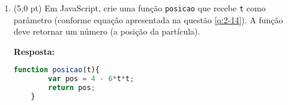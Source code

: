 \documentclass[12pt,a4paper,oneside]{article}
\begin{document}
\begin{enumerate}
\begin{enumerate}
		\item (1,0 pt) Essa modificação aumenta ou diminui o valor de $x$ para o qual a partícula para momentaneamente?\\
		{ \color{blue}
			{\bf Resposta:} \\
			(i) obter v$_{mod}(t)$ a partir de x$_{mod}(t)$:
			\begin{center}
				v$_{mod}(t) =$ x'$_{mod}(t)$ $\therefore$\\
				v$_{mod}(t) = -12t + 20$
			\end{center}
			(ii) instante que a partícula para momentaneamente:
				\begin{eqnarray*}
					v_{mod}(t) 	& = & -12t + 20 \\
					0 			& = & -12t + 20 \\
					t 			& \cong & 1,67 s
				\end{eqnarray*}
			(ii) posição que a partícula para momentaneamente:
			\begin{eqnarray*}
				x_{mod}(t) 	& = & 4,0 + 20t - 6,0t^2 \\
				x_{mod}(1,67) 	& = & 4,0 + 20 \times 1,67 - 6,0 \times (1,67)^2 \\
				x_{mod}(1,67) 	& \cong & 4,0 + 33,4 -16,73 \\
				x_{mod}(1,67) 	& \cong & 20,67 m
			\end{eqnarray*}	
			A posição que partícula para é aproximadamente 20,67 m. Como antes a posição era 4,0 m, então a modificação aumenta o valor de x.
		}
	\end{enumerate}

	\item (5,0 pt) Em JavaScript, crie uma função {\tt posicao} que recebe {\tt t} como parâmetro (conforme equação apresentada na questão \ref{q:2-14}). A função deve retornar um número (a posição da partícula).
	
	{\color{blue} {\bf Resposta:} }
	
	\begin{lstlisting}[language=JavaScript]
	function posicao(t){
		var pos = 4 - 6*t*t;
		return pos;
	}\end{lstlisting}
	
	\end{enumerate}
\end{document}
